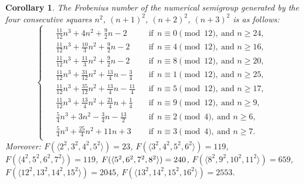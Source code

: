 \documentclass[12pt]{article}
\newtheorem{cor}[thm]{Corollary}
\theoremstyle{remark}
\begin{document}
\begin{cor}\label{corfrobsquares}
The Frobenius number of the numerical semigroup generated by the four consecutive squares $n^2$, $(n+1)^2$, $(n+2)^2$, $(n+3)^2$ is as follows:
$$
\begin{cases}
\begin{aligned}
&\frac{11}{12} n^3 + 4 n^2 + \frac{9}{2} n - 2
    &&\text{if} \ \ n \equiv 0 \pmod{12},\ \text{and } n \ge 24,\\
&\frac{11}{12} n^3 + \frac{10}{3} n^2 + \frac{9}{2} n - 2
    &&\text{if} \ \ n \equiv 4 \pmod{12},\ \text{and } n \ge 16,\\
&\frac{11}{12} n^3 + \frac{11}{3} n^2 + \frac{9}{2} n - 2
    &&\text{if} \ \ n \equiv 8 \pmod{12},\ \text{and } n \ge 20,\\
&\frac{11}{12} n^3 + \frac{31}{12} n^2 + \frac{13}{4} n - \frac{3}{4}
    &&\text{if} \ \ n \equiv 1 \pmod{12},\ \text{and } n \ge 25,\\
&\frac{11}{12} n^3 + \frac{35}{12} n^2 + \frac{13}{4} n - \frac{11}{4}
    &&\text{if} \ \ n \equiv 5 \pmod{12},\ \text{and } n \ge 17,\\
&\frac{11}{12} n^3 + \frac{13}{4} n^2 + \frac{21}{4} n + \frac{1}{4}
    &&\text{if} \ \ n \equiv 9 \pmod{12},\ \text{and } n \ge 9,\\
&\frac{5}{4} n^3 + 3 n^2 - \frac{3}{4} n - \frac{13}{2}
    &&\text{if} \ \ n \equiv 2 \pmod{4},\ \text{and } n \ge 6,\\
&\frac{5}{4} n^3 + \frac{25}{4} n^2 + 11 n + 3
    &&\text{if} \ \ n \equiv 3 \pmod{4},\ \text{and } n \ge 7.
\end{aligned}
\end{cases}
$$
Moreover: $F(\langle 2^2, 3^2, 4^2, 5^2 \rangle) = 23$, 
$F(\langle 3^2, 4^2, 5^2, 6^2 \rangle) = 119$,
$F(\langle 4^2, 5^2, 6^2, 7^2 \rangle) = 119$,
$F(\langle 5^2, 6^2, 7^2, 8^2 \rangle) \\ = 240$,
$F(\langle 8^2, 9^2, 10^2, 11^2 \rangle) = 659$,
$ F(\langle12^2,13^2,14^2,15^2 \rangle) = 2045$, 
$F(\langle 13^2, 14^2, 15^2, 16^2 \rangle) = 2553$.

\end{cor}
\end{document}
